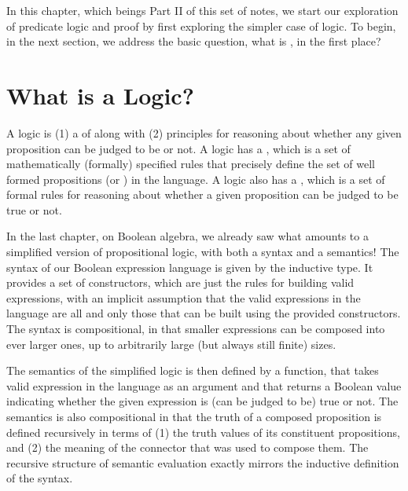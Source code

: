 \documentclass[letterpaper,10pt,english]{sphinxmanual}
\begin{document}
In this chapter, which beings Part II of this set of notes, we start
our exploration of predicate logic and proof by first exploring the
simpler case of  logic.  To begin, in the next section,
we address the basic question, what is , in the first place?


\section{What is a Logic?}
\label{\detokenize{09-propositional-logic:what-is-a-logic}}
A logic is (1) a  of  along with (2)
principles for reasoning about whether any given proposition can be
judged to be  or not. A logic has a , which is a set of
mathematically (formally) specified rules that precisely define the
set of well formed propositions (or )
in the language. A logic also has a , which is a set of
formal rules for reasoning about whether a given proposition can be
judged to be true or not.

In the last chapter, on Boolean algebra, we already saw what amounts
to a simplified version of propositional logic, with both a syntax and
a semantics! The syntax of our Boolean expression language is given by
the inductive  type.  It provides a set of constructors, which
are just the rules for building valid expressions, with an implicit
assumption that the valid expressions in the language are all and only
those that can be built using the provided constructors. The syntax is
compositional, in that smaller expressions can be composed into ever
larger ones, up to arbitrarily large (but always still finite) sizes.

The semantics of the simplified logic is then defined by a  function, that takes  valid expression in the
language as an argument and that returns a Boolean value indicating
whether the given expression is (can be judged to be) true or not.
The semantics is also compositional in that the truth of a composed
proposition is defined recursively in terms of (1) the truth values of
its constituent propositions, and (2) the meaning of the connector
that was used to compose them. The recursive structure of semantic
evaluation exactly mirrors the inductive definition of the syntax.
\end{document}

